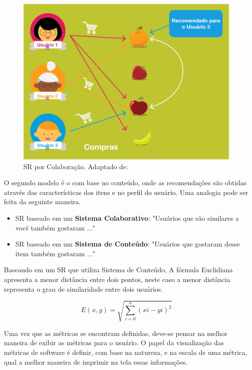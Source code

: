 \graphicspath{{figuras/}}
\begin{figure}[h!]
\centering
\includegraphics[scale=0.50]{sr1.png}
\caption{SR por Colaboração. Adaptado de: \cite{sarwar2001item}}
\label{img:sr1}
\end{figure}

O segundo modelo é o com base no conteúdo, onde as recomendações são obtidas através das características dos itens e no perfil do usuário. Uma analogia pode ser feita da seguinte maneira.

 \begin{itemize}
 \item SR baseado em um \textbf{Sistema Colaborativo}: "Usuários que são similares a você também gostaram ..."
 \item SR baseado em um \textbf{Sistema de Conteúdo}: "Usuários que gostaram desse item também gostaram ..." 
 \end{itemize}
 

Baseando em um SR que utiliza Sistema de Conteúdo, A fórmula Euclidiana apresenta a menor distância entre dois pontos, neste caso a menor distância representa o grau de similaridade entre dois usuários. 

\[E(x,y) = \sqrt{\sum_{i=0}^{n}(xi-yi)^{2}}\]


Uma vez que as métricas se encontram definidas, deve-se pensar na melhor maneira de exibir as métricas para o usuário. O papel da visualização das métricas de software é definir, com base na natureza, e na escala de uma métrica, qual a melhor maneira de imprimir na tela essas informações.


